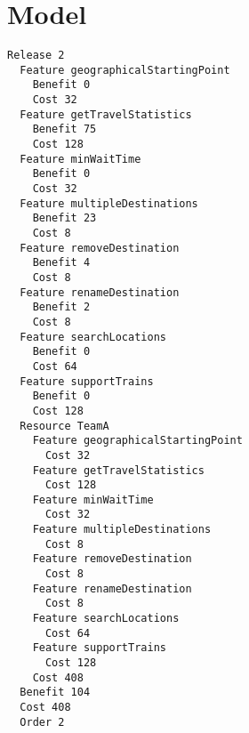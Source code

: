 \chapter{Model}


\begin{lstlisting}
Release 2
  Feature geographicalStartingPoint
    Benefit 0
    Cost 32
  Feature getTravelStatistics
    Benefit 75
    Cost 128
  Feature minWaitTime
    Benefit 0
    Cost 32
  Feature multipleDestinations
    Benefit 23
    Cost 8
  Feature removeDestination
    Benefit 4
    Cost 8
  Feature renameDestination
    Benefit 2
    Cost 8
  Feature searchLocations
    Benefit 0
    Cost 64
  Feature supportTrains
    Benefit 0
    Cost 128
  Resource TeamA
    Feature geographicalStartingPoint
      Cost 32
    Feature getTravelStatistics
      Cost 128
    Feature minWaitTime
      Cost 32
    Feature multipleDestinations
      Cost 8
    Feature removeDestination
      Cost 8
    Feature renameDestination
      Cost 8
    Feature searchLocations
      Cost 64
    Feature supportTrains
      Cost 128
    Cost 408
  Benefit 104
  Cost 408
  Order 2

\end{lstlisting}